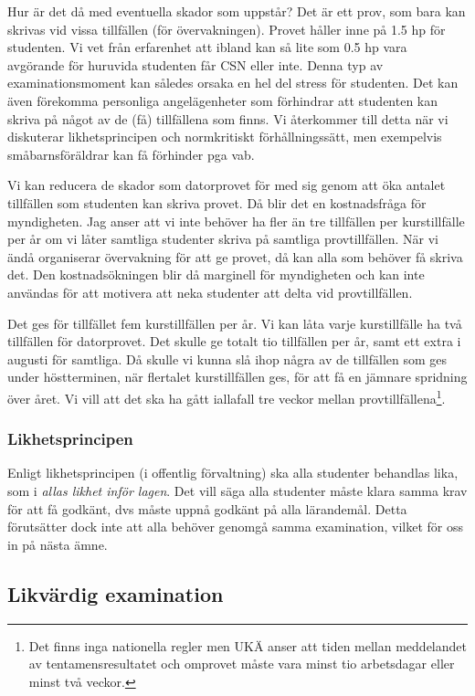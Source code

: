 Hur är det då med eventuella skador som uppstår?
Det är ett prov, som bara kan skrivas vid vissa tillfällen (för övervakningen).
Provet håller inne på 1.5 hp för studenten.
Vi vet från erfarenhet att ibland kan så lite som 0.5 hp vara avgörande för 
huruvida studenten får CSN eller inte.
Denna typ av examinationsmoment kan således orsaka en hel del stress för 
studenten.
Det kan även förekomma personliga angelägenheter som förhindrar att studenten 
kan skriva på något av de (få) tillfällena som finns.
Vi återkommer till detta när vi diskuterar likhetsprincipen och normkritiskt 
förhållningssätt, men exempelvis småbarnsföräldrar kan få förhinder pga vab.

Vi kan reducera de skador som datorprovet för med sig genom att öka antalet 
tillfällen som studenten kan skriva provet.
Då blir det en kostnadsfråga för myndigheten.
Jag anser att vi inte behöver ha fler än tre tillfällen per kurstillfälle per 
år om vi låter samtliga studenter skriva på samtliga provtillfällen.
När vi ändå organiserar övervakning för att ge provet, då kan alla som behöver 
få skriva det.
Den kostnadsökningen blir då marginell för myndigheten och kan inte användas 
för att motivera att neka studenter att delta vid provtillfällen.

Det ges för tillfället fem kurstillfällen per år.
Vi kan låta varje kurstillfälle ha två tillfällen för datorprovet.
Det skulle ge totalt tio tillfällen per år,
samt ett extra i augusti för samtliga.
Då skulle vi kunna slå ihop några av de tillfällen som ges under höstterminen, 
när flertalet kurstillfällen ges, för att få en jämnare spridning över året.
Vi vill att det ska ha gått iallafall tre veckor mellan 
provtillfällena\footnote{%
  Det finns inga nationella regler men UKÄ anser att tiden mellan meddelandet 
  av tentamensresultatet och omprovet måste vara minst tio arbetsdagar eller 
  minst två veckor.
}.

\subsubsection{Likhetsprincipen}

Enligt likhetsprincipen (i offentlig förvaltning) ska alla studenter behandlas 
lika, som i \emph{allas likhet inför lagen}.
Det vill säga alla studenter måste klara samma krav för att få godkänt, dvs 
måste uppnå godkänt på alla lärandemål.
Detta förutsätter dock inte att alla behöver genomgå samma examination, vilket 
för oss in på nästa ämne.

\subsection{Likvärdig examination}

